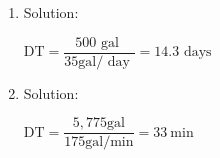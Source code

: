 \documentclass{article}
\begin{document}
\begin{enumerate}
\item Solution:\\

\vspace{0.4cm}

$
\mathrm{DT}=\dfrac{500 \text { gal }}{35 \mathrm{gal} / \text { day }}=14.3 \text { days }
$
\vspace{0.4cm}

\item Solution:\\

\vspace{0.4cm}

$
\mathrm{DT}=\dfrac{5,775 \mathrm{gal}}{175 \mathrm{gal} / \mathrm{min}}=33 \mathrm{~min}
$

\end{enumerate}
\vspace{1cm}
\end{document}
